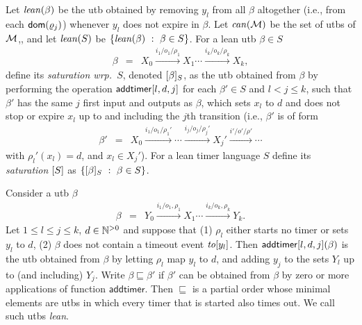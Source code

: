 Let $\mathit{lean}({\beta})$ be the utb obtained by removing 
$y_l$ from all $\beta$ altogether (i.e., from each ${\textsf{dom}}(\varrho_j)$)
whenever $y_l$ does not expire in $\beta$.
Let $\mathit{can}({{\mathcal M}})$ be the set of utbs of ${\mathcal M}$,, and
let 
$\mathit{lean}({S})$ be $\lbrace \mathit{lean}({\beta}) ~:~ \beta \in S\rbrace$.
For a lean utb $\beta \in S$
\begin{eqnarray*}
\beta & = & X_0 \xrightarrow{i_1/o_1/\rho_1} X_1  \cdots \xrightarrow{i_k/o_k/\rho_k} X_{k},
\end{eqnarray*}
define its \emph{saturation wrp.\ $S$}, denoted $[\beta]_{S}$,
as the utb obtained from $\beta$ by performing the operation
$\mathsf{addtimer}[{l,d,j}]$ 
for each $\beta' \in S$ and $l < j \leq k$, such that $\beta'$ has the same
$j$ first input and outputs as $\beta$, which sets $x_l$ to $d$ and does not stop
or expire $x_l$ up to and including the $j$th transition (i.e., $\beta'$ is of
form
\begin{eqnarray*}
\beta' & = & X_0 \xrightarrow{i_1/o_1/\rho_1'} \cdots \xrightarrow{i_j/o_j/\rho_j'} X_{j}' \xrightarrow{i'/o'/\rho'}  \cdots
\end{eqnarray*}
with $\rho_l'(x_l) = d$, and $x_l \in X_j'$).
For a lean timer language $S$ define its \emph{saturation} $[S]$
as $\lbrace [\beta]_{S} ~:~ \beta \in S\rbrace$.

Consider a utb $\beta$
\begin{eqnarray*}
\beta & = & Y_0 \xrightarrow{i_1/o_1, \rho_1} X_1  \cdots \xrightarrow{i_k/o_k, \rho_k} Y_{k}.
\end{eqnarray*}
Let $1 \leq l \leq j \leq k$, $d \in {\mathbb N}^{>0}$ and suppose that 
(1) $\rho_l$ either starts no timer or sets $y_l$ to $d$,
(2) $\beta$ does not contain a timeout event $\mathit{to}[y_l]$.
Then $\mathsf{addtimer}[{l,d,j}]({\beta})$ is the utb obtained from $\beta$ by
letting $\rho_l$ map $y_l$ to $d$, and adding $y_j$ to the sets $Y_l$ up to (and including) $Y_j$.
Write $\beta \sqsubseteq \beta'$ if $\beta'$ can be obtained from $\beta$ by zero or more applications of function $\mathsf{addtimer}.$
Then $\sqsubseteq$ is a partial order whose minimal elements are utbs in which every timer that is started also times out.
We call such utbs \emph{lean}.

